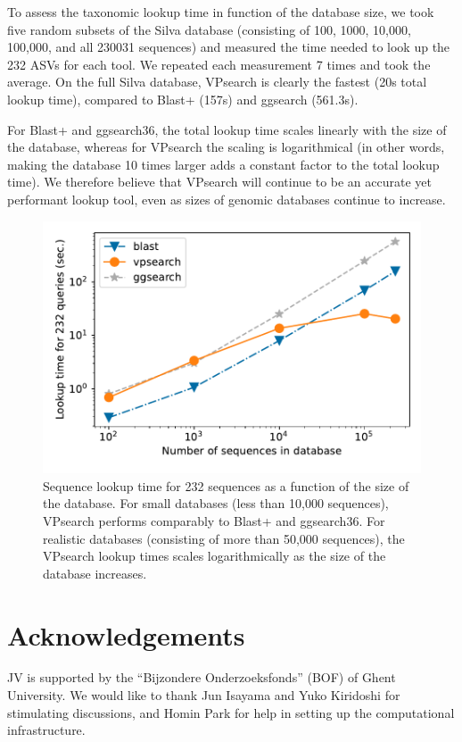 \documentclass{bioinfo}
\begin{document}
To assess the taxonomic lookup time in function of the database size, we took
five random subsets of the Silva database (consisting of 100, 1000, 10,000, 100,000,
and all 230031 sequences) and measured the time needed to look up the 232 ASVs
for each tool. We repeated each measurement 7 times and took the average. On
the full Silva database, VPsearch is clearly the fastest (20s total lookup
time), compared to Blast+ (157s) and ggsearch (561.3s).

For Blast+ and ggsearch36, the total lookup time scales linearly with the size
of the database, whereas for VPsearch the scaling is logarithmical (in other
words, making the database 10 times larger adds a constant factor to the total
lookup time). We therefore believe that VPsearch will continue to be an accurate
yet performant lookup tool, even as sizes of genomic databases continue to increase.

\begin{figure}
  \includegraphics[scale=0.5]{execution-time.pdf}
  \caption{Sequence lookup time for 232 sequences as a function of the size of
    the database. For small databases (less than 10,000 sequences), VPsearch
    performs comparably to Blast+ and ggsearch36. For realistic databases
    (consisting of more than 50,000 sequences), the VPsearch lookup times
    scales logarithmically as the size of the database increases.}
\end{figure}

\vspace*{-0.7cm}
\section*{Acknowledgements}

JV is supported by the ``Bijzondere Onderzoeksfonds'' (BOF) of Ghent University. We
would like to thank Jun Isayama and Yuko Kiridoshi for stimulating discussions,
and Homin Park for help in setting up the computational infrastructure.


\vspace*{-0.5cm}


\end{document}

